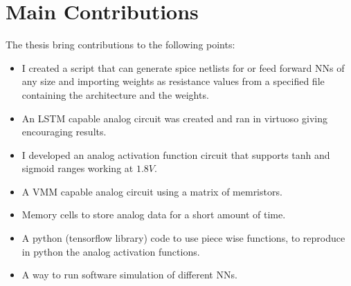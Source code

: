 \section{Main Contributions}
\label{sec:contributions}

The thesis bring contributions to the following points:

\begin{itemize}
  \item I created a script that can generate spice netlists for  or feed forward \aclp{NN} of any size and importing weights as resistance values from a specified file containing the architecture and the weights.
  \item An \ac{LSTM} capable analog circuit was created and ran in virtuoso giving encouraging results.
  \item I developed an analog activation function circuit that supports \ac{tanh} and sigmoid ranges working at $1.8V$.
  \item A \ac{VMM} capable analog circuit using a matrix of memristors.
  \item Memory cells to store analog data for a short amount of time.
  \item A python (tensorflow library) code to use piece wise functions, to reproduce in python the analog activation functions.
  \item A way to run software simulation of different \acp{NN}.
\end{itemize}

